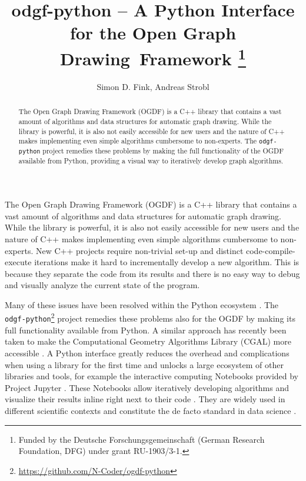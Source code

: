 \documentclass{llncs}
\title{odgf-python -- A Python Interface for the Open Graph Drawing~Framework%
  \thanks{Funded by the Deutsche Forschungsgemeinschaft (German Research Foundation, DFG) under grant RU-1903/3-1.}
}
\author{Simon D. Fink\orcidID{0000-0002-2754-1195}, Andreas Strobl}
\institute{University of Passau, Faculty for Mathematics and Computer Science, Germany\\\email{\{finksim,strobland\}@fim.uni-passau.de}}
\date{}
\begin{document}
\maketitle

\begin{abstract}
The Open Graph Drawing Framework (OGDF) is a C++ library that contains a vast amount of algorithms and data structures for automatic graph drawing.
While the library is powerful, it is also not easily accessible for new users and the nature of C++ makes implementing even simple algorithms cumbersome to non-experts.
The \texttt{odgf-python} project remedies these problems by making the full functionality of the OGDF available from Python, providing a visual way to iteratively develop graph algorithms.

\end{abstract}


The Open Graph Drawing Framework (OGDF) \cite{cgj-tog-13} is a C++ library that contains a vast amount of algorithms and data structures for
automatic graph drawing.
While the library is powerful, it is also not easily accessible for new users and the nature of C++ makes implementing even simple algorithms cumbersome to non-experts.
New C++ projects require non-trivial set-up and distinct code-compile-execute iterations make it hard to incrementally develop a new algorithm.
This is because they separate the code from its results and there is no easy way to debug and visually analyze the current state of the program.

Many of these issues have been resolved within the Python ecosystem \cite{per-tcc-21}.
The \texttt{odgf-python}\footnote{\url{https://github.com/N-Coder/ogdf-python}} project remedies these problems also for the OGDF by making its full functionality available from Python.
A similar approach has recently been taken to make the Computational Geometry Algorithms Library (CGAL) more accessible \cite{gfh-cmm-22}.
A Python interface greatly reduces the overhead and complications when using a library for the first time and unlocks a large ecosystem
of other libraries and tools, for example the interactive computing Notebooks provided by Project Jupyter \cite{krp-jn-16}.
These Notebooks allow iteratively developing algorithms and visualize their results inline right next to their code \cite{per-tcc-21}.
They are widely used in different scientific contexts and constitute the de facto standard in data science \cite{per-wji-18}.
\end{document}
